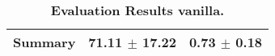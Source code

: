 \begin{table}[htb]
{\begin{tabular}{lll}
\midrule
\textbf{Summary                                  } &                  \phantom{0}71.11 $\pm$ 17.22 &             \phantom{0}0.73 $\pm$ \phantom{0}0.18 \\
\bottomrule
\end{tabular}%
}
\caption{\textbf{Evaluation Results vanilla.}}
\label{tab:eval-results}
\end{table}
